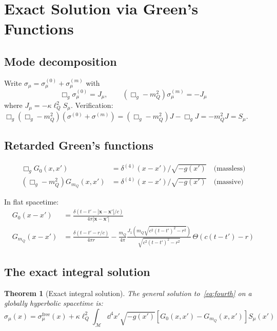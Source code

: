 \documentclass[11pt,a4paper]{article}
\theoremstyle{plain}
\newtheorem{theorem}{Theorem}[section]
\theoremstyle{definition}
\theoremstyle{remark}
\newcommand{\lQ}{\ell_Q}
\newcommand{\mQ}{m_Q}
\begin{document}
\section{Exact Solution via Green's Functions}
\label{sec:green}

\subsection{Mode decomposition}

Write $\sigma_\mu = \sigma_\mu^{(0)} + \sigma_\mu^{(m)}$ with
\begin{equation}
  \Box_g\sigma_\mu^{(0)} = J_\mu, \qquad (\Box_g - \mQ^2)\sigma_\mu^{(m)} = -J_\mu
\end{equation}
where $J_\mu = -\kappa\lQ^2 S_\mu$.  Verification: $\Box_g(\Box_g - \mQ^2)(\sigma^{(0)} + \sigma^{(m)}) = (\Box_g - \mQ^2)J - \Box_g J = -\mQ^2 J = S_\mu$.\;\checkmark

\subsection{Retarded Green's functions}

\begin{align}
  \Box_g G_0(x,x') &= \delta^{(4)}(x-x')/\sqrt{-g(x')} \quad\text{(massless)} \\
  (\Box_g - \mQ^2)G_{\mQ}(x,x') &= \delta^{(4)}(x-x')/\sqrt{-g(x')} \quad\text{(massive)}
\end{align}

In flat spacetime:
\begin{align}
  G_0(x-x') &= \frac{\delta(t-t'-|\mathbf{x}-\mathbf{x}'|/c)}{4\pi|\mathbf{x}-\mathbf{x}'|} \\[4pt]
  G_{\mQ}(x-x') &= \frac{\delta(t-t'-r/c)}{4\pi r} - \frac{\mQ}{4\pi}\frac{J_1(\mQ\sqrt{c^2(t-t')^2-r^2})}{\sqrt{c^2(t-t')^2-r^2}}\,\Theta(c(t-t')-r)
\end{align}

\subsection{The exact integral solution}

\begin{theorem}[Exact integral solution]\label{thm:exact}
  The general solution to~\eqref{eq:fourth} on a globally hyperbolic spacetime is:
  \begin{equation}
    \boxed{\sigma_\mu(x) = \sigma_\mu^{\mathrm{free}}(x) + \kappa\lQ^2\!\int_{\mathcal{M}}\!\dd^4x'\sqrt{-g(x')}[G_0(x,x') - G_{\mQ}(x,x')]S_\mu(x')}
    \label{eq:exact}
  \end{equation}
\end{theorem}
\end{document}
